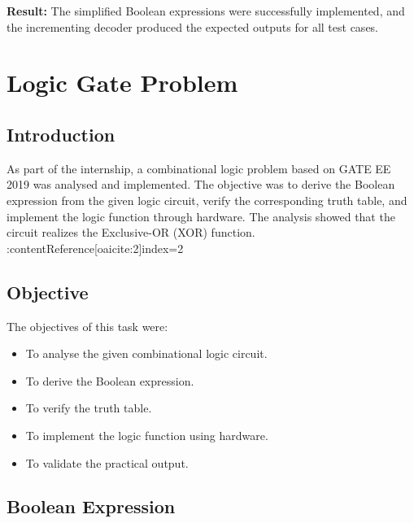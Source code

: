 \documentclass[12pt,a4paper]{report}
\begin{document}
\textbf{Result:} The simplified Boolean expressions were successfully implemented, and the incrementing decoder produced the expected outputs for all test cases.



\chapter{Logic Gate Problem}

\section{Introduction}

As part of the internship, a combinational logic problem based on GATE EE 2019 was analysed and implemented. The objective was to derive the Boolean expression from the given logic circuit, verify the corresponding truth table, and implement the logic function through hardware. The analysis showed that the circuit realizes the Exclusive-OR (XOR) function. :contentReference[oaicite:2]{index=2}


\section{Objective}

The objectives of this task were:

\begin{itemize}
    \item To analyse the given combinational logic circuit.
    \item To derive the Boolean expression.
    \item To verify the truth table.
    \item To implement the logic function using hardware.
    \item To validate the practical output.
\end{itemize}


\section{Boolean Expression}
\end{document}
